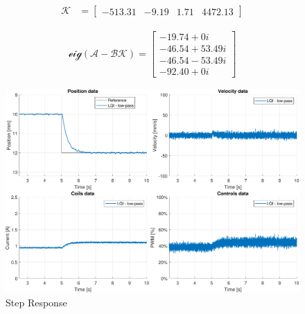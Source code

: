 \begin{equation}
    \begin{aligned}
        \mathcal{K} & =
        \begin{bmatrix}
            -513.31 & -9.19 & 1.71 & 4472.13
        \end{bmatrix}
    \end{aligned}
\end{equation}

\begin{equation}
    \begin{aligned}
        \mathcal{eig(A-BK)}  =
        \begin{bmatrix}
            -19.74 + 0i     \\
            -46.54 + 53.49i \\
            -46.54 - 53.49i \\
            -92.40 + 0i
        \end{bmatrix}
    \end{aligned}
\end{equation}

\begin{figure}[H]
    \centering
    \includegraphics[width=1\linewidth]{./img/MATLAB/results/step_LQI_star.pdf}
    \caption{Step Response}
    \label{fig:Step Response}
\end{figure}
